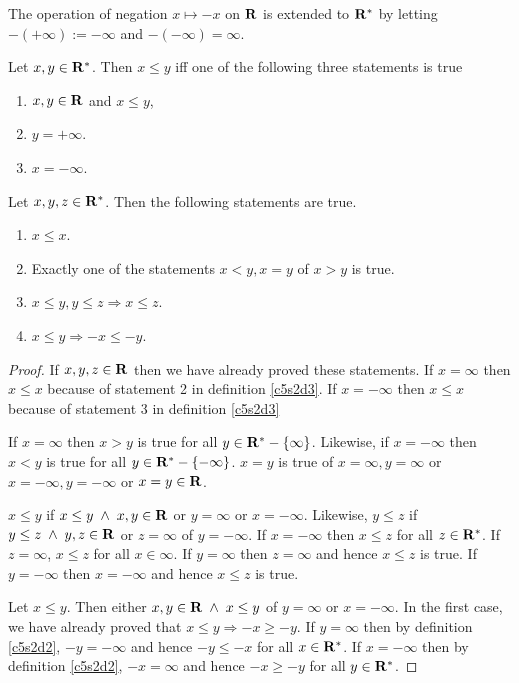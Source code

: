 \begin{defn}\label{c5s2d2}
The operation of negation $x \mapsto -x$ on $\mathbf{R}$ is extended to $\mathbf{R}^\ast$ by
letting $-(+\infty) := -\infty$ and $-(-\infty) = \infty$.
\end{defn}

\begin{defn}\label{c5s2d3}
Let $x, y \in \mathbf{R}^\ast$. Then $x \le y$ iff one of the following three statements
is true
\begin{enumerate}
\item $x, y \in \mathbf{R}$ and $x \le y$,
\item $y = +\infty$.
\item $x = -\infty$.
\end{enumerate}
\end{defn}

\begin{lem}\label{c5s2l1}
Let $x, y, z \in \mathbf{R}^\ast$. Then the following statements are true.
\begin{enumerate}
\item $x \le x$.
\item Exactly one of the statements $x < y, x = y$ of $x > y$ is true.
\item $x \le y, y \le z \Rightarrow x \le z$.
\item $x \le y \Rightarrow -x \le -y$.
\end{enumerate}
\end{lem}
\begin{proof}
If $x, y, z \in \mathbf{R}$ then we have already proved these statements. If $x = 
\infty$ then $x \le x$ because of statement 2 in definition \ref{c5s2d3}. If
$x = -\infty$ then $x \le x$ because of statement 3 in definition 
\ref{c5s2d3}

If $x = \infty$ then $x > y$ is true for all $y \in \mathbf{R}^\ast - \{\infty\}$. 
Likewise, if $x = -\infty$ then $x < y$ is true for all $y \in \mathbf{R}^\ast - 
\{-\infty\}$. $x = y$ is true of $x = \infty, y = \infty$ or $x = -\infty,
y = -\infty$ or $x = y \in \mathbf{R}$.

$x \le y$ if $x \le y \;\land\; x, y \in \mathbf{R}$ or $y = \infty$ or $x = 
-\infty$. Likewise, $y \le z$ if $y \le z \;\land\; y, z \in \mathbf{R}$ or $z =
\infty$ of $y = -\infty$. If $x = -\infty$ then $x \le z$ for all $z \in 
\mathbf{R}^\ast$. If $z = \infty$, $x \le z$ for all $x \in \infty$. If $y = \infty$
then $z = \infty$ and hence $x \le z$ is true. If $y = -\infty$ then $x =
-\infty$ and hence $x \le z$ is true. 

Let $x \le y$. Then either $x, y \in \mathbf{R} \;\land\; x \le y$ of $y = \infty$
or $x = -\infty$. In the first case, we have already proved that $x \le y
\Rightarrow -x \ge -y$. If $y = \infty$ then by definition \ref{c5s2d2},
$-y = -\infty$ and hence $-y \le -x$ for all $x \in \mathbf{R}^\ast$. If $x = -\infty$
then by definition \ref{c5s2d2}, $-x = \infty$ and hence $-x \ge -y$ for all
$y \in \mathbf{R}^\ast$.
\end{proof}

